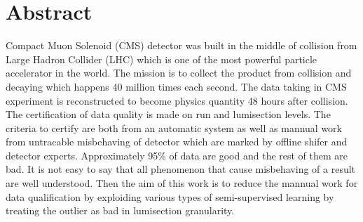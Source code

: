 \chapter*{\Large \center Abstract}


Compact Muon Solenoid (CMS) detector was built in the middle of collision from Large Hadron Collider (LHC) which is one of the most powerful particle accelerator in the world. The mission is to collect the product from collision and decaying which happens 40 million times each second.
The data taking in CMS experiment is reconstructed to become physics quantity 48 hours after collision. The certification of data quality is made on run and lumisection levels. The criteria to certify are both from an automatic system as well as mannual work from untracable misbehaving of detector which are marked by offline shifer and detector experts.
Approximately 95\% of data are good and the rest of them are bad. It is not easy to say that all phenomenon that cause misbehaving of a result are well understood.
Then the aim of this work is to reduce the mannual work for data qualification by exploiding various types of semi-supervised learning by treating the outlier as bad in lumisection granularity.